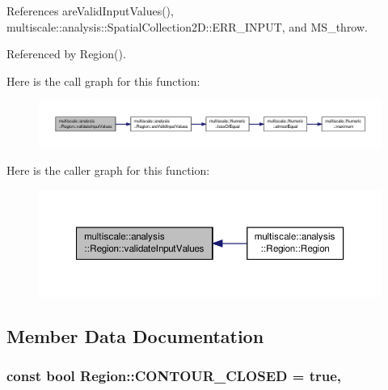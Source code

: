 References are\-Valid\-Input\-Values(), multiscale\-::analysis\-::\-Spatial\-Collection2\-D\-::\-E\-R\-R\-\_\-\-I\-N\-P\-U\-T, and M\-S\-\_\-throw.



Referenced by Region().



Here is the call graph for this function\-:\nopagebreak
\begin{figure}[H]
\begin{center}
\leavevmode
\includegraphics[width=350pt]{classmultiscale_1_1analysis_1_1Region_a517b46fd89696f44086aafb1a9526995_cgraph}
\end{center}
\end{figure}




Here is the caller graph for this function\-:\nopagebreak
\begin{figure}[H]
\begin{center}
\leavevmode
\includegraphics[width=350pt]{classmultiscale_1_1analysis_1_1Region_a517b46fd89696f44086aafb1a9526995_icgraph}
\end{center}
\end{figure}




\subsection{Member Data Documentation}
\hypertarget{classmultiscale_1_1analysis_1_1Region_a52c0c66ccfe38dc19379abaeba529f19}{
\subsubsection[{C\-O\-N\-T\-O\-U\-R\-\_\-\-C\-L\-O\-S\-E\-D}]{\setlength{\rightskip}{0pt plus 5cm}const bool Region\-::\-C\-O\-N\-T\-O\-U\-R\-\_\-\-C\-L\-O\-S\-E\-D = true\hspace{0.3cm}{\ttfamily [static]}, {\ttfamily [private]}}}\label{classmultiscale_1_1analysis_1_1Region_a52c0c66ccfe38dc19379abaeba529f19}


